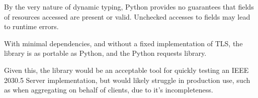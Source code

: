By the very nature of dynamic typing, Python provides no guarantees that fields of resources accessed are present or valid. Unchecked accesses to fields may lead to runtime errors. 

With minimal dependencies, and without a fixed implementation of TLS, the library is as portable as Python, and the Python requests library.

Given this, the library would be an acceptable tool for quickly testing an IEEE 2030.5 Server implementation, but would likely struggle in production use, such as when aggregating on behalf of clients, due to it's incompleteness.







